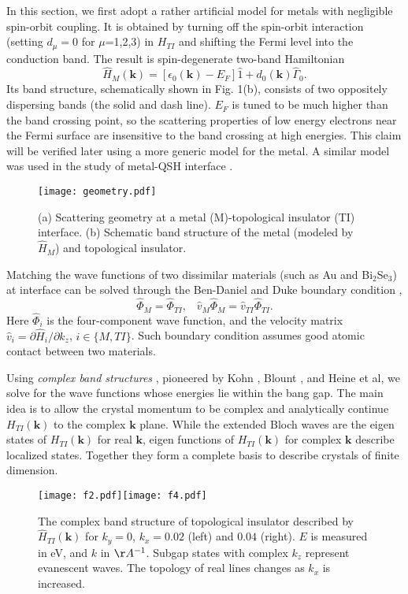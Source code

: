 \documentclass[12pt,twocolumn]{article}
\def\v#1{\mathbf{#1}}
\begin{document}
In this section, we first adopt a rather artificial model for metals with negligible 
spin-orbit coupling. It is
obtained by turning off the spin-orbit interaction (setting $d_\mu=0$ for $\mu$=1,2,3) 
in $H_{TI}$ and shifting the Fermi level into 
the conduction band. The result is spin-degenerate two-band Hamiltonian
\[
\hat{H}_M(\v{k})=[\epsilon_0(\v{k})-E_F]\hat{1}+d_0(\v{k})\hat{\Gamma}_0.
\]
Its band structure, schematically shown in Fig. 1(b), consists of two oppositely dispersing bands 
(the solid and dash line). $E_F$ is tuned to be much higher than the band crossing point, so
the scattering properties of low energy electrons near the Fermi surface are 
insensitive to the band crossing at high energies. This claim will be verified later using a
more generic model for the metal. A similar model was used in the study of metal-QSH interface \cite{yokoyama09}.


\begin{figure}
\texttt{[image: geometry.pdf]}
\caption{(a) Scattering geometry at a metal (M)-topological insulator (TI) interface.
(b) Schematic band structure of the metal (modeled by $\hat{H}_M$) and topological insulator.
}
\end{figure}


Matching the wave functions of two dissimilar 
materials (such as Au and Bi$_2$Se$_3$) at interface can be solved through the Ben-Daniel 
and Duke boundary condition \cite{duke,bc},
\[
\hat{\Phi}_M=\hat{\Phi}_{TI}, \;\;\; \hat{v}_M \hat{\Phi}_M = \hat{v}_{TI}\hat{\Phi}_{TI}.
\]
Here $\hat{\Phi}_i$ is the four-component wave function, and 
the velocity matrix $\hat{v}_{i}=\partial \hat{H}_i/\partial k_z$, $i\in \{M, TI\}$. 
Such boundary condition assumes good atomic contact between two materials.

Using {\it complex band structures} , pioneered by Kohn \cite{kohn59}, Blount \cite{blount62}, 
and Heine \cite{heine63} et al, we solve for the wave functions whose energies lie within the bang gap.
The main idea is to allow the crystal momentum to be complex and analytically continue
$H_{TI}(\v{k})$ to the complex $\v{k}$ plane. 
While the extended Bloch waves are the eigen states of $H_{TI}(\v{k})$ for real $\v{k}$, 
eigen functions of $H_{TI}(\v{k})$ for complex $\v{k}$ describe localized states. Together they
form a complete basis to describe crystals of finite dimension. 

\begin{figure}
\texttt{[image: f2.pdf]}\texttt{[image: f4.pdf]}
\caption{The complex band structure
of topological insulator described by $\hat{H}_{TI}(\v{k})$ 
for $k_y=0$, $k_x=0.02$ (left) and $0.04$ (right). $E$ is measured in eV, and $k$ in $\AA^{-1}$.
Subgap states with complex $k_z$ represent evanescent waves. 
The topology of  real lines \cite{heine63}  changes as $k_x$ is increased.  
}
\end{figure}
\end{document}
